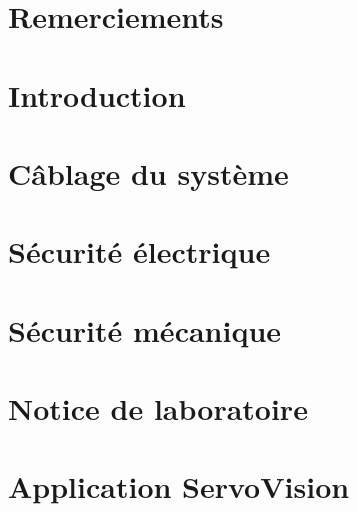 \documentclass[
    iai, %
    eai, %
    confidential, %
]{heig-tb}
\begin{document}
\maketitle
\frontmatter
\clearemptydoublepage

\preamble
\authentification
\chapter*{Remerciements}


\begin{abstract}
    
\end{abstract}
\clearemptydoublepage
{
    \tableofcontents
    \let\cleardoublepage\clearpage
}
\printnomenclature
\clearemptydoublepage
{}

\mainmatter
\chapter{Introduction}

% 
\chapter{Câblage du système}


\chapter{Sécurité électrique} \label{chapter:securite_electrique}

\chapter{Sécurité mécanique} \label{chapter:securite_mecanique}

\chapter{Notice de laboratoire} \label{chapter:notice_labo}

\chapter{Application ServoVision} \label{chapter:app_servovision}

\end{document}
